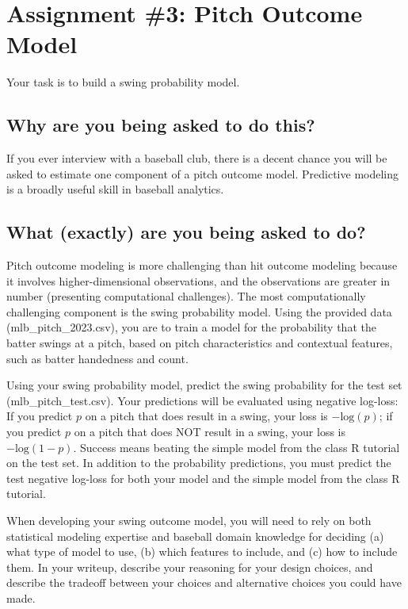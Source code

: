 \documentclass{article}
\begin{document}
  \section*{\sc Assignment \#3: Pitch Outcome Model}

    Your task is to build a swing probability model.

    \subsection*{\sc Why are you being asked to do this?}

      If you ever interview with a baseball club, there is a decent chance you will be asked to estimate one component of a pitch outcome model. Predictive modeling is a broadly useful skill in baseball analytics.

    \subsection*{\sc What (exactly) are you being asked to do?}

      Pitch outcome modeling is more challenging than hit outcome modeling because it involves higher-dimensional observations, and the observations are greater in number (presenting computational challenges). The most computationally challenging component is the swing probability model. Using the provided data (mlb\_pitch\_2023.csv), you are to train a model for the probability that the batter swings at a pitch, based on pitch characteristics and contextual features, such as batter handedness and count.
      
      Using your swing probability model, predict the swing probability for the test set (mlb\_pitch\_test.csv). Your predictions will be evaluated using negative log-loss: If you predict $p$ on a pitch that does result in a swing, your loss is $-\mbox{log}(p)$; if you predict $p$ on a pitch that does NOT result in a swing, your loss is $-\mbox{log}(1 - p)$. Success means beating the simple model from the class R tutorial on the test set. In addition to the probability predictions, you must predict the test negative log-loss for both your model and the simple model from the class R tutorial.

      When developing your swing outcome model, you will need to rely on both statistical modeling expertise and baseball domain knowledge for deciding (a) what type of model to use, (b) which features to include, and (c) how to include them. In your writeup, describe your reasoning for your design choices, and describe the tradeoff between your choices and alternative choices you could have made.
\end{document}
